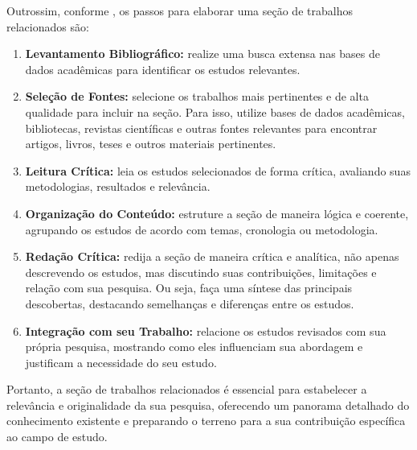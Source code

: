Outrossim, conforme , os passos para elaborar uma seção de trabalhos relacionados são:
\begin{enumerate}[label=\roman*., nosep, leftmargin=2.5cm]
    \item \textbf{Levantamento Bibliográfico:} realize uma busca extensa nas bases de dados acadêmicas para identificar os estudos relevantes.
    \item \textbf{Seleção de Fontes:} selecione os trabalhos mais pertinentes e de alta qualidade para incluir na seção. Para isso, utilize bases de dados acadêmicas, bibliotecas, revistas científicas e outras fontes relevantes para encontrar artigos, livros, teses e outros materiais pertinentes.
    \item \textbf{Leitura Crítica:} leia os estudos selecionados de forma crítica, avaliando suas metodologias, resultados e relevância.
    \item \textbf{Organização do Conteúdo:} estruture a seção de maneira lógica e coerente, agrupando os estudos de acordo com temas, cronologia ou metodologia.
    \item \textbf{Redação Crítica:} redija a seção de maneira crítica e analítica, não apenas descrevendo os estudos, mas discutindo suas contribuições, limitações e relação com sua pesquisa. Ou seja, faça uma síntese das principais descobertas, destacando semelhanças e diferenças entre os estudos.
    \item \textbf{Integração com seu Trabalho:} relacione os estudos revisados com sua própria pesquisa, mostrando como eles influenciam sua abordagem e justificam a necessidade do seu estudo.
\end{enumerate}

Portanto, a seção de trabalhos relacionados é essencial para estabelecer a relevância e originalidade da sua pesquisa, oferecendo um panorama detalhado do conhecimento existente e preparando o terreno para a sua contribuição específica ao campo de estudo.